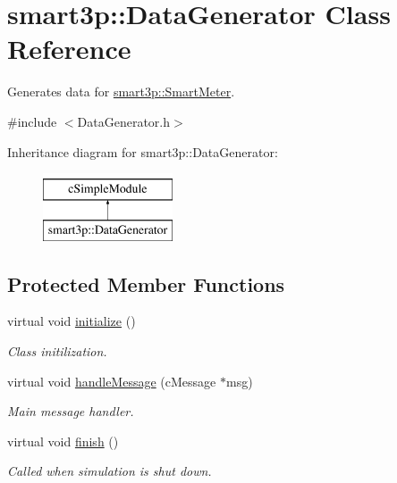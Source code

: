 \hypertarget{classsmart3p_1_1DataGenerator}{}\section{smart3p\+:\+:Data\+Generator Class Reference}
\label{classsmart3p_1_1DataGenerator}


Generates data for \hyperlink{classsmart3p_1_1SmartMeter}{smart3p\+::\+Smart\+Meter}.  




{\ttfamily \#include $<$Data\+Generator.\+h$>$}

Inheritance diagram for smart3p\+:\+:Data\+Generator\+:\begin{figure}[H]
\begin{center}
\leavevmode
\includegraphics[height=2.000000cm]{classsmart3p_1_1DataGenerator}
\end{center}
\end{figure}
\subsection*{Protected Member Functions}
\begin{DoxyCompactItemize}
\item 
virtual void \hyperlink{classsmart3p_1_1DataGenerator_a0a4e7108a50c24c2485645d314892581}{initialize} ()
\begin{DoxyCompactList}\small\item\em Class initilization. \end{DoxyCompactList}\item 
virtual void \hyperlink{classsmart3p_1_1DataGenerator_a5a26a1e77fc192ce9024e9fad5b16a38}{handle\+Message} (c\+Message $\ast$msg)
\begin{DoxyCompactList}\small\item\em Main message handler. \end{DoxyCompactList}\item 
virtual void \hyperlink{classsmart3p_1_1DataGenerator_a30cad918b7a471eeec37508e7d4a9c07}{finish} ()
\begin{DoxyCompactList}\small\item\em Called when simulation is shut down. \end{DoxyCompactList}\end{DoxyCompactItemize}


